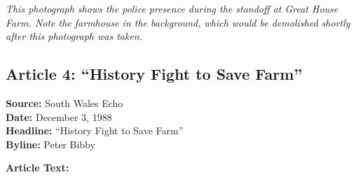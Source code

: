 \documentclass[11pt,a4paper]{article}
\begin{document}
\textit{This photograph shows the police presence during the standoff at Great House Farm. Note the farmhouse in the background, which would be demolished shortly after this photograph was taken.}

\newpage

\subsection{Article 4: ``History Fight to Save Farm''}

\begin{newspaperquote}
\textbf{Source:} South Wales Echo\\
\textbf{Date:} December 3, 1988\\
\textbf{Headline:} ``History Fight to Save Farm''\\
\textbf{Byline:} Peter Bibby
\end{newspaperquote}

\textbf{Article Text:}
\end{document}
